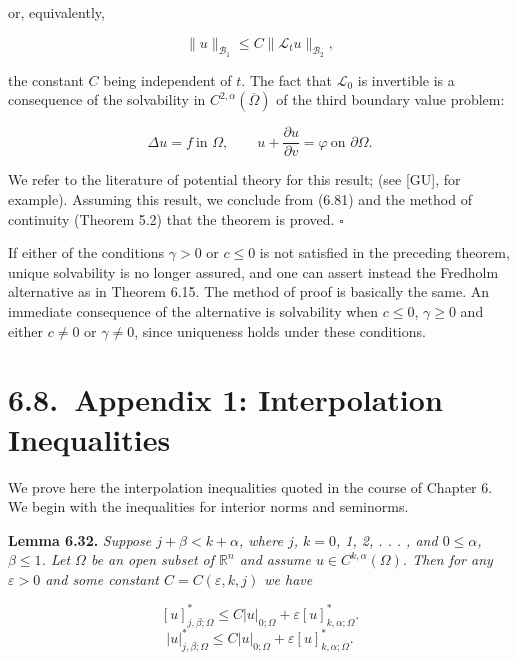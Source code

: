 
or, equivalently,

\begin{equation}
\tag{6.81}
\|u\|_{\mathscr{B}_1}\le C\|\mathcal{L}_t u\|_{\mathscr{B}_2},
\end{equation}

the constant $C$ being independent of $t$. The fact that $\mathcal{L}_0$ is invertible is a consequence
of the solvability in $C^{2,\alpha}(\overline{\Omega})$ of the third boundary value problem:

\[
\Delta u=f\ \text{in }\Omega,\qquad u+\frac{\partial u}{\partial v}=\varphi\ \text{on }\partial\Omega.
\]

We refer to the literature of potential theory for this result; (see [GU], for example).
Assuming this result, we conclude from (6.81) and the method of continuity
(Theorem 5.2) that the theorem is proved. $\square$

If either of the conditions $\gamma>0$ or $c\leq 0$ is not satisfied in the preceding theorem,
unique solvability is no longer assured, and one can assert instead the Fredholm
alternative as in Theorem 6.15. The method of proof is basically the same. An
immediate consequence of the alternative is solvability when $c\leq 0$, $\gamma\geq 0$ and
either $c\neq 0$ or $\gamma\neq 0$, since uniqueness holds under these conditions.

\bigskip

\section*{6.8.\ Appendix 1: Interpolation Inequalities}

We prove here the interpolation inequalities quoted in the course of Chapter 6. We
begin with the inequalities for interior norms and seminorms.

\medskip

\noindent\textbf{Lemma 6.32.} \textit{Suppose $j+\beta<k+\alpha$, where $j$, $k=0$, 1, 2, . . . , and $0\leq\alpha$, $\beta\leq 1$.
Let $\Omega$ be an open subset of $\mathbb{R}^n$ and assume $u\in C^{k,\alpha}(\Omega)$. Then for any $\varepsilon>0$ and some
constant $C=C(\varepsilon, k, j)$ we have}

\begin{equation}
\tag{6.82}
[u]^{*}_{j,\beta;\Omega}\leq C|u|_{0;\Omega}+\varepsilon [u]^{*}_{k,\alpha;\Omega}.
\end{equation}
\[
|u|^{*}_{j,\beta;\Omega}\leq C|u|_{0;\Omega}+\varepsilon [u]^{*}_{k,\alpha;\Omega}.
\]

